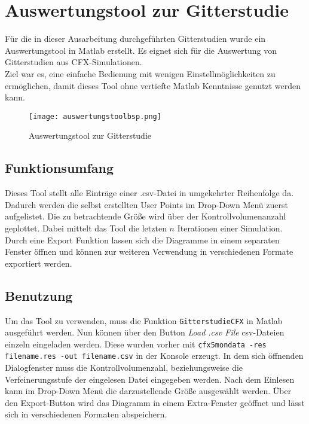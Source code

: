 \chapter{Auswertungstool zur Gitterstudie}
\label{cha:auswertungstool}
Für die in dieser Ausarbeitung durchgeführten Gitterstudien wurde ein Auswertungstool in Matlab erstellt. Es eignet sich für die Auswertung von Gitterstudien aus CFX-Simulationen.\\
Ziel war es, eine einfache Bedienung mit wenigen Einstellmöglichkeiten zu ermöglichen, damit dieses Tool ohne vertiefte Matlab Kenntnisse genutzt werden kann.

\begin{figure}[htbp]
	\centering
	\label{fig:auswerungbsp}
	\texttt{[image: auswertungstoolbsp.png]}
	\caption{Auswertungstool zur Gitterstudie}
\end{figure}

\section{Funktionsumfang}
Dieses Tool stellt alle Einträge einer .csv-Datei in umgekehrter Reihenfolge da. Dadurch werden die selbst erstellten User Points im Drop-Down Menü zuerst aufgelistet. Die zu betrachtende Größe wird über der Kontrollvolumenanzahl geplottet. Dabei mittelt das Tool die letzten $n$ Iterationen einer Simulation. Durch eine Export Funktion lassen sich die Diagramme in einem separaten Fenster öffnen und können zur weiteren Verwendung in verschiedenen Formate exportiert werden.

\section{Benutzung}
Um das Tool zu verwenden, muss die Funktion \texttt{GitterstudieCFX} in Matlab ausgeführt werden. Nun können über den Button \textit{Load .csv File} csv-Dateien einzeln eingeladen werden. Diese wurden vorher mit \texttt{cfx5mondata -res filename.res -out filename.csv} in der Konsole erzeugt. In dem sich öffnenden Dialogfenster muss die Kontrollvolumenzahl, beziehungsweise  die Verfeinerungsstufe der eingelesen Datei eingegeben werden. Nach dem Einlesen kann im Drop-Down Menü die darzustellende Größe ausgewählt werden. Über den Export-Button wird das Diagramm in einem Extra-Fenster geöffnet und lässt sich in verschiedenen Formaten abspeichern.

